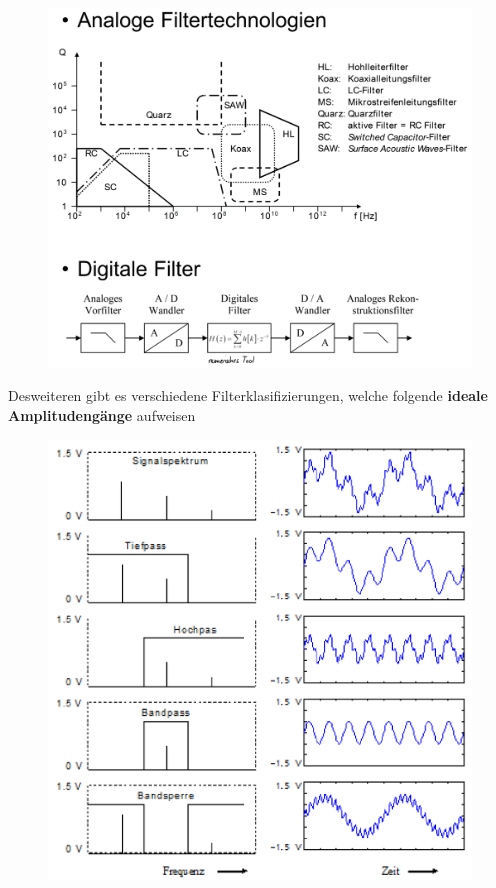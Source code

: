 \documentclass[
  10pt,
  a4paper,
  german]{article}
\numberwithin{equation}{section}
\begin{document}
\begin{figure}[H]

{\centering \includegraphics{images/03_Filtertechnologien.png}

}

\end{figure}

Desweiteren gibt es verschiedene Filterklasifizierungen, welche folgende
\textbf{ideale Amplitudengänge} aufweisen

\begin{figure}[H]

{\centering \includegraphics{images/03_Filterklasifizierungen.png}

}

\end{figure}
\end{document}
